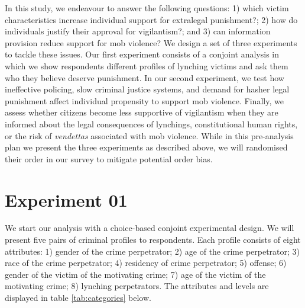 \documentclass[12pt,a4paper,]{article}
\begin{document}
In this study, we endeavour to answer the following questions: 1) which
victim characteristics increase individual support for extralegal
punishment?; 2) how do individuals justify their approval for
vigilantism?; and 3) can information provision reduce support for mob
violence? We design a set of three experiments to tackle these issues.
Our first experiment consists of a conjoint analysis in which we show
respondents different profiles of lynching victims and ask them who they
believe deserve punishment. In our second experiment, we test how
ineffective policing, slow criminal justice systems, and demand for
hasher legal punishment affect individual propensity to support mob
violence. Finally, we assess whether citizens become less supportive of
vigilantism when they are informed about the legal consequences of
lynchings, constitutional human rights, or the risk of \emph{vendettas}
associated with mob violence. While in this pre-analysis plan we present
the three experiments as described above, we will randomised their order
in our survey to mitigate potential order bias.

\hypertarget{experiment-01}{%
\section{Experiment 01}\label{experiment-01}}

\label{sub:exp01}

We start our analysis with a choice-based conjoint experimental design.
We will present five pairs of criminal profiles to respondents. Each
profile consists of eight attributes: 1) gender of the crime
perpetrator; 2) age of the crime perpetrator; 3) race of the crime
perpetrator; 4) residency of crime perpetrator; 5) offense; 6) gender of
the victim of the motivating crime; 7) age of the victim of the
motivating crime; 8) lynching perpetrators. The attributes and levels
are displayed in table \ref{tab:categories} below.

\vspace{.3cm}
\end{document}
